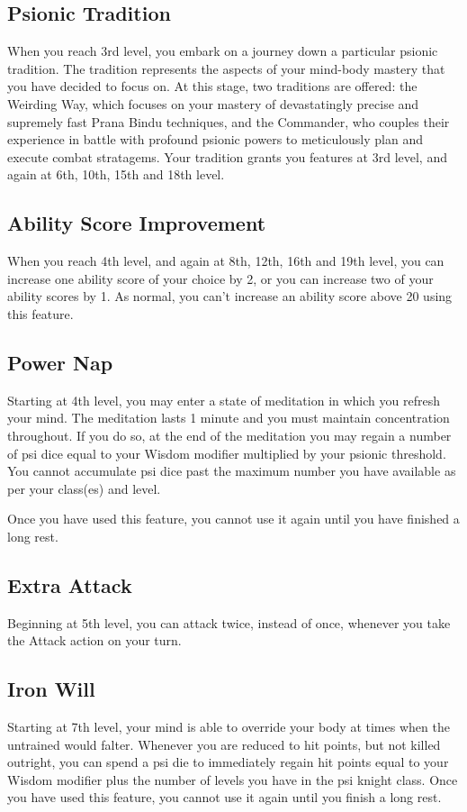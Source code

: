 \subsection{Psionic Tradition}
When you reach 3rd level,
you embark on a journey down a particular
psionic tradition.
The tradition represents the aspects of
your mind-body mastery that you have decided
to focus on.
At this stage, two traditions are offered:
the Weirding Way, which focuses on your mastery
of devastatingly precise and supremely fast
Prana Bindu techniques,
and the Commander,
who couples their experience in battle
with profound psionic powers to meticulously
plan and execute combat stratagems.
Your tradition grants you features at 3rd level,
and again at 6th, 10th, 15th and 18th level.

\subsection{Ability Score Improvement}
When you reach 4th level,
and again at 8th, 12th, 16th and 19th level,
you can increase one ability score of your choice by 2,
or you can increase two of your ability scores by 1.
As normal,
you can't increase an ability score above 20 using this feature.

\subsection{Power Nap}
Starting at 4th level,
you may enter a state of meditation
in which you refresh your mind.
The meditation lasts 1 minute and
you must maintain concentration throughout.
If you do so,
at the end of the meditation you may regain a number of psi dice
equal to your Wisdom modifier multiplied by your psionic threshold.
You cannot accumulate psi dice past the maximum number you have available
as per your class(es) and level.

Once you have used this feature,
you cannot use it again until you have finished a long rest.

\subsection{Extra Attack}
Beginning at 5th level, you can attack twice,
instead of once,
whenever you take the Attack action on your turn.

\subsection{Iron Will}
Starting at 7th level,
your mind is able to override your body at times
when the untrained would falter.
Whenever you are reduced to hit points,
but not killed outright,
you can spend a psi die to immediately regain hit points
equal to your Wisdom modifier plus the number of levels
you have in the psi knight class.
Once you have used this feature,
you cannot use it again until you finish a long rest.

